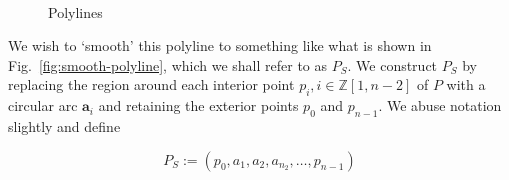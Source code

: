 \documentclass{article}
\begin{document}
\begin{figure}[h]
  \centering
  \hfill
  \\
  \caption{Polylines}
\end{figure}

We wish to `smooth' this polyline to something like what is shown in Fig.~\ref{fig:smooth-polyline}, which we shall refer to as $P_S$.  We construct $P_S$ by replacing the region around each interior point $p_{i}, i \in \mathbb{Z}\left[1, n-2\right]$ of $P$ with a circular arc $\mathbf{a}_{i}$ and retaining the exterior points $p_0$ and $p_{n-1}$.  We abuse notation slightly and define

\begin{equation}
  \label{eq:p-smooth}
  P_S := \left(p_0, a_1, a_2, a_{n_2}, \ldots, p_{n-1}\right)
\end{equation}
\end{document}
